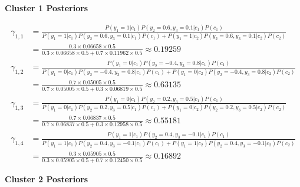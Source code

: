 \documentclass[12pt]{article}
\begin{document}
\begin{enumerate}[leftmargin=\labelsep]
          \begin{center}
              \textbf{\colorbox{bmint}{Cluster 1 Posteriors}}
          \end{center}

          \vskip -0.5cm
          \begingroup
          \addtolength{\jot}{0.7em}
          \begin{align*}
              \gamma_{1,1} & = \frac{P(y_1=1|c_1)P(y_2=0.6,y_3=0.1|c_1)P(c_1)}{P(y_1=1|c_1)P(y_2=0.6,y_3=0.1|c_1)P(c_1) + P(y_1=1|c_2)P(y_2=0.6,y_3=0.1|c_2)P(c_2)} \\
                           & = \frac{0.3 \times 0.06658 \times 0.5}{0.3 \times 0.06658 \times 0.5 + 0.7 \times 0.11962 \times 0.5} \approx 0.19259 \\
              \gamma_{1,2} & = \frac{P(y_1=0|c_1)P(y_2=-0.4,y_3=0.8|c_1)P(c_1)}{P(y_1=0|c_1)P(y_2=-0.4,y_3=0.8|c_1)P(c_1) + P(y_1=0|c_2)P(y_2=-0.4,y_3=0.8|c_2)P(c_2)} \\
                           & = \frac{0.7 \times 0.05005 \times 0.5}{0.7 \times 0.05005 \times 0.5 + 0.3 \times 0.06819 \times 0.5} \approx 0.63135 \\
              \gamma_{1,3} & = \frac{P(y_1=0|c_1)P(y_2=0.2,y_3=0.5|c_1)P(c_1)}{P(y_1=0|c_1)P(y_2=0.2,y_3=0.5|c_1)P(c_1) + P(y_1=0|c_2)P(y_2=0.2,y_3=0.5|c_2)P(c_2)} \\
                           & = \frac{0.7 \times 0.06837 \times 0.5}{0.7 \times 0.06837 \times 0.5 + 0.3 \times 0.12958 \times 0.5} \approx 0.55181 \\
              \gamma_{1,4} & = \frac{P(y_1=1|c_1)P(y_2=0.4,y_3=-0.1|c_1)P(c_1)}{P(y_1=1|c_1)P(y_2=0.4,y_3=-0.1|c_1)P(c_1) + P(y_1=1|c_2)P(y_2=0.4,y_3=-0.1|c_2)P(c_2)} \\
                           & = \frac{0.3 \times 0.05905 \times 0.5}{0.3 \times 0.05905 \times 0.5 + 0.7 \times 0.12450 \times 0.5} \approx 0.16892
          \end{align*}
          \endgroup

          \begin{center}
              \textbf{\colorbox{byellow}{Cluster 2 Posteriors}}
          \end{center}


\end{enumerate}
\end{document}
